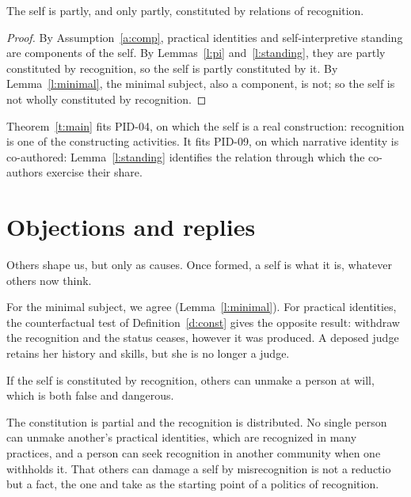 \documentclass{situationist-preprint}
\begin{document}
\begin{theorem}\label{t:main}
The self is partly, and only partly, constituted by relations of recognition.
\end{theorem}

\begin{proof}
By Assumption~\ref{a:comp}, practical identities and self-interpretive standing are components of the self. By Lemmas~\ref{l:pi} and~\ref{l:standing}, they are partly constituted by recognition, so the self is partly constituted by it. By Lemma~\ref{l:minimal}, the minimal subject, also a component, is not; so the self is not wholly constituted by recognition.
\end{proof}

Theorem~\ref{t:main} fits PID-04, on which the self is a real construction: recognition is one of the constructing activities. It fits PID-09, on which narrative identity is co-authored: Lemma~\ref{l:standing} identifies the relation through which the co-authors exercise their share.

\section{Objections and replies}

\begin{objection}
Others shape us, but only as causes. Once formed, a self is what it is, whatever others now think.
\end{objection}

\begin{reply}
For the minimal subject, we agree (Lemma~\ref{l:minimal}). For practical identities, the counterfactual test of Definition~\ref{d:const} gives the opposite result: withdraw the recognition and the status ceases, however it was produced. A deposed judge retains her history and skills, but she is no longer a judge.
\end{reply}

\begin{objection}
If the self is constituted by recognition, others can unmake a person at will, which is both false and dangerous.
\end{objection}

\begin{reply}
The constitution is partial and the recognition is distributed. No single person can unmake another's practical identities, which are recognized in many practices, and a person can seek recognition in another community when one withholds it. That others can damage a self by misrecognition is not a reductio but a fact, the one \citet{Taylor1994} and \citet{Honneth1995} take as the starting point of a politics of recognition.
\end{reply}
\end{document}
